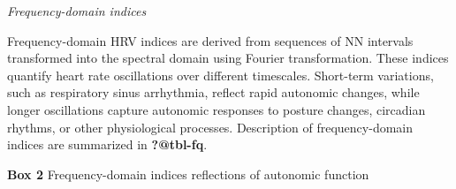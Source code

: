 \documentclass[
  a4paper,
  headsepline=true,
  open=any]{scrbook}
\begin{document}
\begin{table}
\begin{minipage}[t]{\linewidth}
{}

\end{minipage}%

\end{table}

\emph{Frequency-domain indices}

Frequency-domain HRV indices are derived from sequences of NN intervals
transformed into the spectral domain using Fourier transformation. These
indices quantify heart rate oscillations over different timescales.
Short-term variations, such as respiratory sinus arrhythmia, reflect
rapid autonomic changes, while longer oscillations capture autonomic
responses to posture changes, circadian rhythms, or other physiological
processes. Description of frequency-domain indices are summarized in
\textbf{?@tbl-fq}.

\begin{table}

\caption{\textbf{Box 2} Frequency-domain indices reflections of
autonomic function}\begin{minipage}[t]{\linewidth}

{\centering 

}
\end{minipage}
\end{table}
\end{document}
